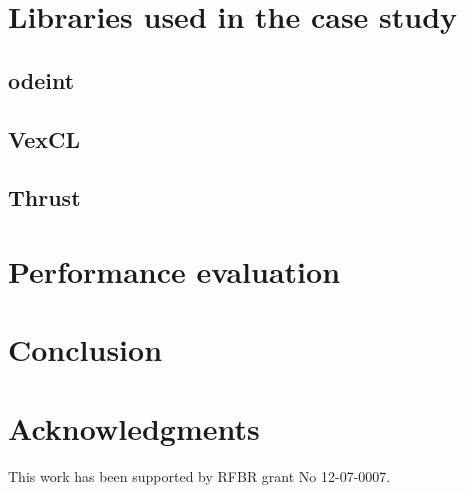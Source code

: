 \documentclass[1p]{elsarticle}
\begin{document}
\section{Libraries used in the case study}
\subsection{odeint}
\subsection{VexCL}
\subsection{Thrust}

\section{Performance evaluation}

\section{Conclusion}

\section{Acknowledgments}

This work has been supported by RFBR grant No 12-07-0007.

\nocite{*}


\end{document}

